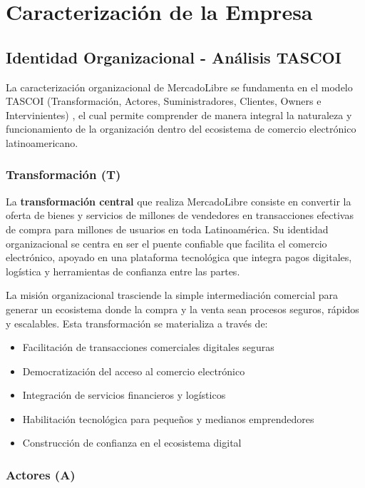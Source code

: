 \section{Caracterización de la Empresa}
\label{sec:caracterizacion}

\subsection{Identidad Organizacional - Análisis TASCOI}

La caracterización organizacional de MercadoLibre se fundamenta en el modelo TASCOI (Transformación, Actores, Suministradores, Clientes, Owners e Intervinientes) \autocite{espejo2011}, el cual permite comprender de manera integral la naturaleza y funcionamiento de la organización dentro del ecosistema de comercio electrónico latinoamericano.

\subsubsection{Transformación (T)}

La \textbf{transformación central} que realiza MercadoLibre consiste en convertir la oferta de bienes y servicios de millones de vendedores en transacciones efectivas de compra para millones de usuarios en toda Latinoamérica. Su identidad organizacional se centra en ser el puente confiable que facilita el comercio electrónico, apoyado en una plataforma tecnológica que integra pagos digitales, logística y herramientas de confianza entre las partes.

La misión organizacional trasciende la simple intermediación comercial para generar un ecosistema donde la compra y la venta sean procesos seguros, rápidos y escalables. Esta transformación se materializa a través de:

\begin{itemize}
\item Facilitación de transacciones comerciales digitales seguras
\item Democratización del acceso al comercio electrónico
\item Integración de servicios financieros y logísticos
\item Habilitación tecnológica para pequeños y medianos emprendedores
\item Construcción de confianza en el ecosistema digital
\end{itemize}

\subsubsection{Actores (A)}

